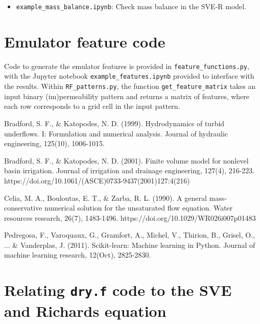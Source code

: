 \documentclass{article}
\newcommand{\code}[1]{\texttt{#1}}
\begin{document}
\begin{itemize}
	\item \code{example\_mass\_balance.ipynb}: Check mass balance in the SVE-R model. 
\end{itemize}

\section{Emulator feature code}
\label{emulator}
Code to generate the emulator features is provided in \code{feature\_functions.py}, with the Jupyter notebook \code{example\_features.ipynb} provided to interface with the results.
Within \code{RF\_patterns.py}, the  function \code{get\_feature\_matrix} takes an input binary (im)permeability pattern and returns a matrix of features, where each row corresponds to a grid cell in the input pattern.


 \begin{thebibliography}{}
  Bradford, S. F., \& Katopodes, N. D. (1999). Hydrodynamics of turbid underflows. I: Formulation and numerical analysis. Journal of hydraulic engineering, 125(10), 1006-1015.

  Bradford, S. F., \& Katopodes, N. D. (2001). Finite volume model for nonlevel basin irrigation. Journal of irrigation and drainage engineering, 127(4), 216-223. https://doi.org/10.1061/(ASCE)0733-9437(2001)127:4(216)
 
  Celia, M. A., Bouloutas, E. T., \& Zarba, R. L. (1990). A general mass‐conservative numerical solution for the unsaturated flow equation. Water resources research, 26(7), 1483-1496.  https://doi.org/10.1029/WR026i007p01483

  Pedregosa, F., Varoquaux, G., Gramfort, A., Michel, V., Thirion, B., Grisel, O., ... \& Vanderplas, J. (2011). Scikit-learn: Machine learning in Python. Journal of machine learning research, 12(Oct), 2825-2830.
 \end{thebibliography}


\appendix


\renewcommand\thefigure{A\arabic{figure}} 
\renewcommand\thetable{A\arabic{table}}
\setcounter{figure}{0}
\setcounter{table}{0}


\section{Relating \code{dry.f} code to the SVE and Richards equation }
\end{document}
